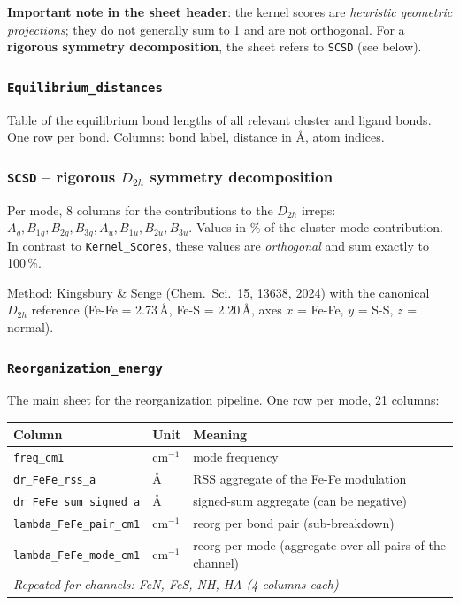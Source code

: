 \documentclass[11pt,a4paper,twoside]{article}
\providecommand{\angstrom}{\text{\AA}}    %
\theoremstyle{remark}
\begin{document}
\textbf{Important note in the sheet header}: the kernel scores
are \emph{heuristic geometric projections}; they do not generally
sum to 1 and are not orthogonal. For a \textbf{rigorous symmetry
decomposition}, the sheet refers to \texttt{SCSD} (see below).

\subsubsection*{\texttt{Equilibrium\_distances}}

Table of the equilibrium bond lengths of all relevant cluster and
ligand bonds. One row per bond. Columns: bond label, distance in
$\angstrom$, atom indices.

\subsubsection*{\texttt{SCSD} -- rigorous $D_{2h}$ symmetry decomposition}

Per mode, 8 columns for the contributions to the $D_{2h}$ irreps:
$A_g, B_{1g}, B_{2g}, B_{3g}, A_u, B_{1u}, B_{2u}, B_{3u}$. Values
in \% of the cluster-mode contribution. In contrast to
\texttt{Kernel\_Scores}, these values are \emph{orthogonal} and
sum exactly to 100\,\%.

Method: Kingsbury \& Senge (Chem.\ Sci.\ 15, 13638, 2024) with the
canonical $D_{2h}$ reference (Fe-Fe = 2.73\,$\angstrom$,
Fe-S = 2.20\,$\angstrom$, axes $x$ = Fe-Fe, $y$ = S-S, $z$ = normal).

\subsubsection*{\texttt{Reorganization\_energy}}
\label{app:sheet-reorg}

The main sheet for the reorganization pipeline. One row per mode,
21 columns:

\begin{center}
\small
\begin{tabular}{p{4.0cm}p{1.4cm}p{7.6cm}}
\toprule
\textbf{Column} & \textbf{Unit} & \textbf{Meaning} \\
\midrule
\texttt{freq\_cm1}                  & cm$^{-1}$ & mode frequency \\
\texttt{dr\_FeFe\_rss\_a}           & $\angstrom$ & RSS aggregate of the Fe-Fe modulation \\
\texttt{dr\_FeFe\_sum\_signed\_a}   & $\angstrom$ & signed-sum aggregate (can be negative) \\
\texttt{lambda\_FeFe\_pair\_cm1}    & cm$^{-1}$ & reorg per bond pair (sub-breakdown) \\
\texttt{lambda\_FeFe\_mode\_cm1}    & cm$^{-1}$ & reorg per mode (aggregate over all
                                                 pairs of the channel) \\
\midrule
\multicolumn{3}{l}{\textit{Repeated for channels: FeN, FeS, NH, HA
       (4 columns each)}} \\
\bottomrule
\end{tabular}
\end{center}
\end{document}
